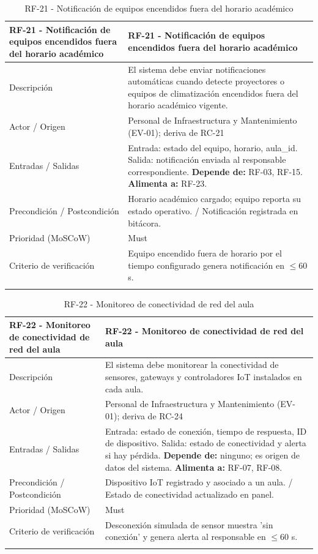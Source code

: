 \begingroup
\small
\begin{longtable}{|P{0.5000}|P{0.5000}|}
\hline
RF-21 - Notificación de equipos encendidos fuera del horario académico & RF-21 - Notificación de equipos encendidos fuera del horario académico \\ \hline
Descripción & El sistema debe enviar notificaciones automáticas cuando detecte proyectores o equipos de climatización encendidos fuera del horario académico vigente. \\ \hline
Actor / Origen & Personal de Infraestructura y Mantenimiento (EV-01); deriva de RC-21 \\ \hline
Entradas / Salidas & Entrada: estado del equipo, horario, aula\_id. Salida: notificación enviada al responsable correspondiente. \textbf{Depende de:} RF-03, RF-15. \textbf{Alimenta a:} RF-23. \\ \hline
Precondición / Postcondición & Horario académico cargado; equipo reporta su estado operativo. / Notificación registrada en bitácora. \\ \hline
Prioridad (MoSCoW) & Must \\ \hline
Criterio de verificación & Equipo encendido fuera de horario por el tiempo configurado genera notificación en $\leq$60 s. \\ \hline
\caption{RF-21 - Notificación de equipos encendidos fuera del horario académico}
\end{longtable}
\endgroup

\begingroup
\small
\begin{longtable}{|P{0.5000}|P{0.5000}|}
\hline
RF-22 - Monitoreo de conectividad de red del aula & RF-22 - Monitoreo de conectividad de red del aula \\ \hline
Descripción & El sistema debe monitorear la conectividad de sensores, gateways y controladores IoT instalados en cada aula. \\ \hline
Actor / Origen & Personal de Infraestructura y Mantenimiento (EV-01); deriva de RC-24 \\ \hline
Entradas / Salidas & Entrada: estado de conexión, tiempo de respuesta, ID de dispositivo. Salida: estado de conectividad y alerta si hay pérdida. \textbf{Depende de:} ninguno; es origen de datos del sistema. \textbf{Alimenta a:} RF-07, RF-08. \\ \hline
Precondición / Postcondición & Dispositivo IoT registrado y asociado a un aula. / Estado de conectividad actualizado en panel. \\ \hline
Prioridad (MoSCoW) & Must \\ \hline
Criterio de verificación & Desconexión simulada de sensor muestra 'sin conexión' y genera alerta al responsable en $\leq$60 s. \\ \hline
\caption{RF-22 - Monitoreo de conectividad de red del aula}
\end{longtable}
\endgroup


